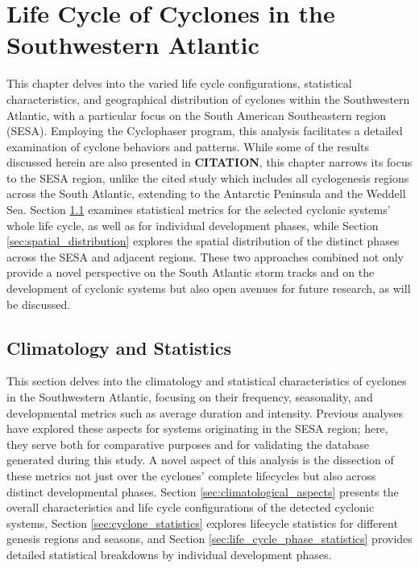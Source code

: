 \chapter{Life Cycle of Cyclones in the Southwestern Atlantic}\label{ch:life_cycle}

This chapter delves into the varied life cycle configurations, statistical characteristics, and geographical distribution of cyclones within the Southwestern Atlantic, with a particular focus on the South American Southeastern region (SESA). Employing the Cyclophaser program, this analysis facilitates a detailed examination of cyclone behaviors and patterns. While some of the results discussed herein are also presented in \textbf{CITATION}, this chapter narrows its focus to the SESA region, unlike the cited study which includes all cyclogenesis regions across the South Atlantic, extending to the Antarctic Peninsula and the Weddell Sea. Section \ref{sec:climatology_statistics} examines statistical metrics for the selected cyclonic systems' whole life cycle, as well as for individual development phases, while Section \ref{sec:spatial_distribution} explores the spatial distribution of the distinct phases across the SESA and adjacent regions. These two approaches combined not only provide a novel perspective on the South Atlantic storm tracks and on the development of cyclonic systems but also open avenues for future research, as will be discussed.

\section{Climatology and Statistics}
\label{sec:climatology_statistics}

This section delves into the climatology and statistical characteristics of cyclones in the Southwestern Atlantic, focusing on their frequency, seasonality, and developmental metrics such as average duration and intensity. Previous analyses have explored these aspects for systems originating in the SESA region; here, they serve both for comparative purposes and for validating the database generated during this study. A novel aspect of this analysis is the dissection of these metrics not just over the cyclones’ complete lifecycles but also across distinct developmental phases. Section \ref{sec:climatological_aspects} presents the overall characteristics and life cycle configurations of the detected cyclonic systems, Section \ref{sec:cyclone_statistics} explores lifecycle statistics for different genesis regions and seasons, and Section \ref{sec:life_cycle_phase_statistics} provides detailed statistical breakdowns by individual development phases.


